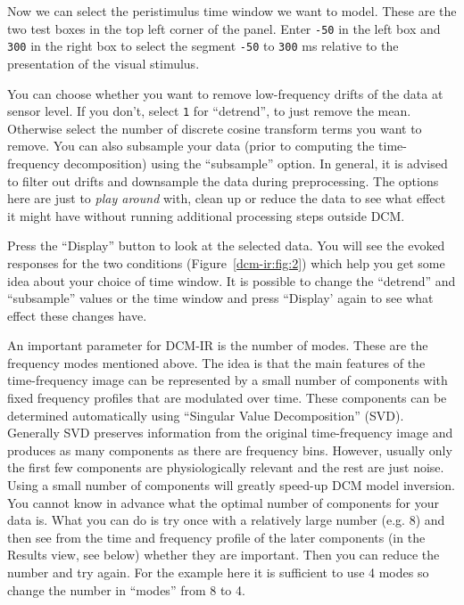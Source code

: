 Now we can select the peristimulus time window we want to model. These are the two test boxes in the top left corner of the panel. Enter \texttt{-50} in the left box and \texttt{300} in the right box to select the segment \texttt{-50} to \texttt{300} ms relative to the presentation of the visual stimulus.  

You can choose whether you want to remove low-frequency drifts of the data at sensor level. If you don't, select \texttt{1} for ``detrend'', to just remove the mean. Otherwise select the number of discrete cosine transform terms you want to remove. You can also subsample your data (prior to computing the time-frequency decomposition) using the ``subsample'' option. In general, it is advised to filter out drifts and downsample the data during preprocessing. The options here are just to \textit{play around} with, clean up or reduce the data to see what effect it might have without running additional processing steps outside DCM.

Press the ``Display'' button to look at the selected data. You will see the evoked responses for the two conditions (Figure~\ref{dcm-ir:fig:2}) which help you get some idea about your choice of time window. It is possible to change the ``detrend'' and ``subsample'' values or the time window and press ``Display' again to see what effect these changes have. 

An important parameter for DCM-IR is the number of modes. These are the frequency modes mentioned above. The idea is that the main features of the time-frequency image can be represented by a small number of components with fixed frequency profiles that are modulated over time. These components can be determined automatically using ``Singular Value Decomposition'' (SVD). Generally SVD preserves information from the original time-frequency image and produces as many components as there are frequency bins. However, usually only the first few components are physiologically relevant and the rest are just noise. Using a small number of components will greatly speed-up DCM model inversion. You cannot know in advance what the optimal number of components for your data is. What you can do is try once with a relatively large number (e.g. 8) and then see from the time and frequency profile of the later components (in the Results view, see below) whether they are important. Then you can reduce the number and try again. For the example here it is sufficient to use 4 modes so change the number in ``modes'' from 8 to 4. 

